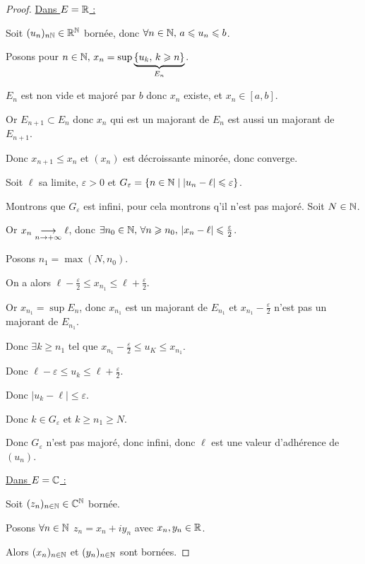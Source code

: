 \begin{proof}
    \uline{Dans $E = \mathbb{R}$ :}

    Soit $(u_n)_{n \mathbb{N}} \in \mathbb{R}^{\mathbb{N}}$ bornée, donc $\forall n \in \mathbb{N}, \, a \leqslant u_n \leqslant b$. 

    Posons pour $n \in \mathbb{N}, \, x_n = \sup \underbrace{\{u_k, \, k \geqslant n\}}_{E_n}$.

    $E_n$ est non vide et majoré par $b$ donc $x_n$ existe, et $x_n \in [a, b]$.

    Or $E_{n + 1} \subset E_n$ donc $x_n$ qui est un majorant de $E_n$ est aussi un majorant de $E_{n + 1}$.

    Donc $x_{n + 1} \leqslant x_n$ et $(x_n)$ est décroissante minorée, donc converge. 

    Soit $\ell$ sa limite, $\varepsilon > 0$ et $G_\varepsilon = \{n \in \mathbb{N} \mid |u_n - \ell| \leqslant \varepsilon\}$.

    Montrons que $G_\varepsilon$ est infini, pour cela montrons q'il n'est pas majoré. Soit $N \in \mathbb{N}$.

    Or $x_n \underset{n \to +\infty}{\longrightarrow} \ell$, donc $\exists n_0 \in \mathbb{N}, \, \forall n \geqslant n_0, \, |x_n - \ell| \leqslant \frac \varepsilon 2$.

    Posons $n_1 = \max(N, n_0)$.

    On a alors $\ell - \frac \varepsilon 2 \leqslant x_{n_1} \leqslant \ell + \frac \varepsilon 2$.

    Or $x_{n_1} = \sup E_n$, donc $x_{n_1} $ est un majorant de $E_{n_1}$ et 
    $x_{n_1} - \frac \varepsilon 2$ n'est pas un majorant de $E_{n_1}$.

    Donc $\exists k \geqslant n_1$ tel que $x_{n_1} - \frac \varepsilon 2 \leqslant u_K \leqslant x_{n_1}$.

    Donc $\ell - \varepsilon \leqslant u_k \leqslant \ell + \frac \varepsilon 2$.

    Donc $| u_k - \ell| \leqslant \varepsilon$. 

    Donc $k \in G_\varepsilon$ et $k \geqslant n_1 \geqslant N$.

    Donc $G_\varepsilon$ n'est pas majoré, donc infini, donc $\ell$ est une valeur d'adhérence de $(u_n)$.

    \qquad \svspace \uline{Dans $E = \mathbb{C}$ :}

    Soit $(z_n)_{n \in \mathbb{N}} \in \mathbb{C}^{\mathbb{N}}$ bornée. 

    Posons $\forall n \in \mathbb{N}$ $z_n = x_n + i y_n$ avec $x_n, y_n \in \mathbb{R}$.

    Alors $(x_n)_{n \in \mathbb{N}}$ et $(y_n)_{n \in \mathbb{N}}$ sont bornées.


\end{proof}
